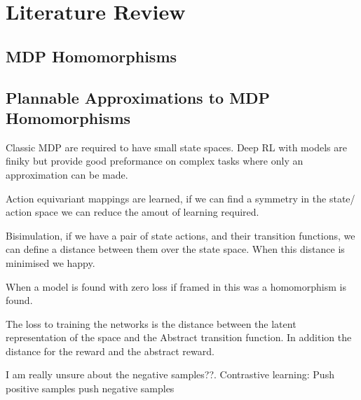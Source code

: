 \chapter{Literature Review}\label{Chap2}

\section{MDP Homomorphisms}

\section{Plannable Approximations to MDP Homomorphisms}
Classic MDP are required to have small state spaces. 
Deep RL with models are finiky but provide good preformance on complex tasks where only an approximation can be made. 

Action equivariant mappings are learned, if we can find a symmetry in the state/ action space we can reduce the amout of learning required. 

Bisimulation, if we have a pair of state actions, and their transition functions, we can define a distance between them over the state space. When this distance is minimised we happy. 

When a model is found with zero loss if framed in this was a homomorphism is found. 


The loss to training the networks is the distance between the latent representation of the space and the Abstract transition function. In addition the distance for the reward and the abstract reward.

I am really unsure about the negative samples??.
Contrastive learning: 
    Push positive samples 
    push negative samples 
